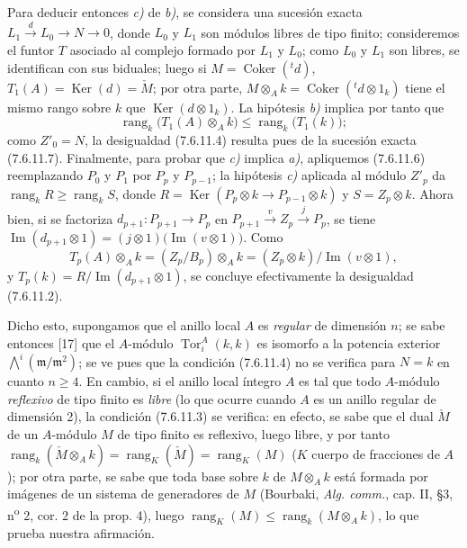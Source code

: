 \begin{remark}[7.6.11]
Para deducir entonces \emph{c)} de \emph{b)}, se considera una sucesión exacta
$L_1\xrightarrow{d}L_0\longrightarrow N\longrightarrow0$,
donde $L_0$ y $L_1$ son módulos libres de tipo finito; consideremos el funtor
$T$ asociado al complejo formado por $L_1$ y $L_0$; como $L_0$ y $L_1$ son
libres, se identifican con sus biduales; luego si
$M=\operatorname{Coker}({}^t d)$, $T_1(A)=\operatorname{Ker}(d)=\check M$;
por otra parte, $M\otimes_A k=\operatorname{Coker}({}^t d\otimes1_k)$ tiene el mismo rango
sobre $k$ que $\operatorname{Ker}(d\otimes1_k)$. La hipótesis \emph{b)} implica por tanto
que
\[
  \operatorname{rang}_k\bigl(T_1(A)\otimes_A k\bigr)
  \leq
  \operatorname{rang}_k\bigl(T_1(k)\bigr);
\]
como $Z'_0=N$, la desigualdad (7.6.11.4) resulta pues de la sucesión exacta
(7.6.11.7).
Finalmente, para probar que \emph{c)} implica \emph{a)}, apliquemos (7.6.11.6) reemplazando
$P_0$ y $P_1$ por $P_p$ y $P_{p-1}$; la hipótesis \emph{c)} aplicada al módulo
$Z'_p$ da $\operatorname{rang}_kR\geq\operatorname{rang}_kS$, donde
$R=\operatorname{Ker}(P_p\otimes k\longrightarrow P_{p-1}\otimes k)$ y $S=Z_p\otimes k$.
Ahora bien, si se factoriza $d_{p+1}:P_{p+1}\to P_p$ en
$P_{p+1}\xrightarrow{v}Z_p\xrightarrow{j}P_p$,
se tiene
$\operatorname{Im}(d_{p+1}\otimes1)=(j\otimes1)\bigl(\operatorname{Im}(v\otimes1)\bigr)$.
Como
\[
  T_p(A)\otimes_A k
  =(Z_p/B_p)\otimes_A k
  =(Z_p\otimes k)/\operatorname{Im}(v\otimes1),
\]
y
$T_p(k)=R/\operatorname{Im}(d_{p+1}\otimes1)$,
se concluye efectivamente la desigualdad (7.6.11.2).

Dicho esto, supongamos que el anillo local $A$ es \emph{regular} de dimensión $n$;
se sabe entonces [17] que el $A$-módulo
$\operatorname{Tor}_i^A(k,k)$ es isomorfo a la potencia exterior
$\bigwedge\nolimits^i(\mathfrak m/\mathfrak m^2)$;
se ve pues que la condición (7.6.11.4) no se verifica para $N=k$ en cuanto
$n\geq4$.
En cambio, si el anillo local íntegro $A$ es tal que todo $A$-módulo \emph{reflexivo}
de tipo finito es \emph{libre} (lo que ocurre cuando $A$ es un anillo regular
de dimensión 2), la condición (7.6.11.3) se verifica: en efecto, se sabe que el
dual $\check M$ de un $A$-módulo $M$ de tipo finito es reflexivo, luego libre, y
por tanto
$\operatorname{rang}_k(\check M\otimes_A k)=\operatorname{rang}_K(\check M)=\operatorname{rang}_K(M)$
($K$ cuerpo de fracciones de $A$); por otra parte, se sabe que toda base sobre $k$
de $M\otimes_A k$ está formada por imágenes de un sistema de generadores de $M$
(Bourbaki, \emph{Alg. comm.}, cap. II, \S 3, n\textsuperscript{o} 2, cor. 2 de
la prop. 4), luego
$\operatorname{rang}_K(M)\leq\operatorname{rang}_k(M\otimes_A k)$, lo que
prueba nuestra afirmación.
\end{remark}

